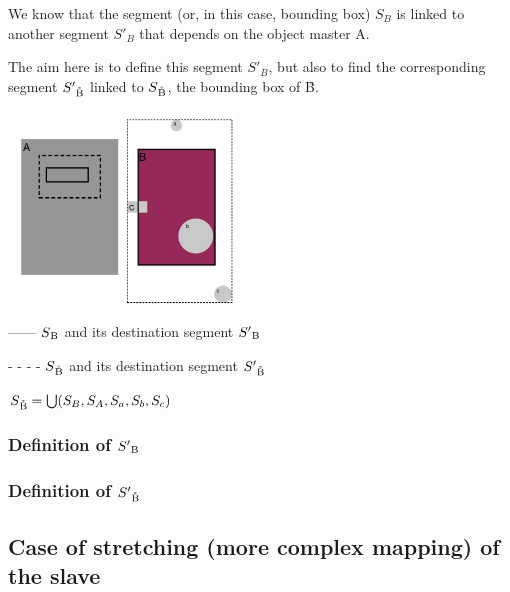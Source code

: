 \documentclass[a4paper]{article}
\begin{document}
We know that the segment (or, in this case, bounding box) $S_B$ is linked to another segment $S'_B$ that depends on the object master A.

The aim here is to define this segment $S'_B$, but also to find the corresponding segment $S'\textsubscript{\r{B}}$ linked to $S\textsubscript{\r{B}}$, the bounding box of \r{B}.

\begin{multicols}{2}

\includegraphics[width=6cm]{img/exemple3.png}   	            

\columnbreak

 ------  $S\textsubscript{B}$ and its destination segment $S'\textsubscript{B}$

\bigskip

 - - - -  $S\textsubscript{\r{B}}$ and its destination segment $S'\textsubscript{\r{B}}$

\bigskip

 $S\textsubscript{\r{B}} = \bigcup(S_B, S_A, S_a, S_b, S_c) $

\end{multicols}


\subsubsection{Definition of $S'\textsubscript{B}$}\label{subsubsec:defDestRect}

\subsubsection{Definition of $S'\textsubscript{\r{B}}$}\label{subsubsec:defDestChildRect}

\subsection{Case of stretching (more complex mapping) of the slave}\label{subsec:complexMap}



\end{document}
